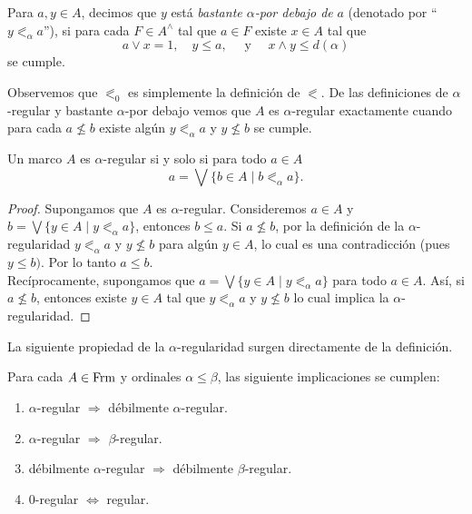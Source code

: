 \begin{dfn}\label{Definicion8.3.2}
    Para $a, y\in A$, decimos que $y$ está \emph{bastante $\alpha$-por debajo de} $a$ (denotado por ``$y\eqslantless_\alpha a$''), si para cada $F\in A^\wedge$ tal que $a\in F$ existe $x\in A$ tal que 
    \[
    a\vee x=1,\quad y\leq a,\quad  \mbox{ y }\quad x\wedge y\leq d(\alpha)
    \]
    se cumple.
\end{dfn}

Observemos que $\eqslantless_0$ es simplemente la definición de $\eqslantless$. De las definiciones de $\alpha$-regular y bastante $\alpha$-por debajo vemos que $A$ es $\alpha$-regular exactamente cuando para cada $a\nleq b$ existe algún $y\eqslantless_\alpha a$ y $y\nleq b$ se cumple.

\begin{lem}\label{Lema8.3.3}
    Un marco $A$ es $\alpha$-regular si y solo si para todo $a\in A$
    \[
    a=\bigvee\{b\in A\mid b\eqslantless_\alpha a\}.
    \]
\end{lem}

\begin{proof}
    Supongamos que $A$ es $\alpha$-regular. Consideremos $a\in A$ y $b=\bigvee\{y\in A\mid y\eqslantless_\alpha a\}$, entonces $b\leq a$. Si $a\nleq b$, por la definición de la $\alpha$-regularidad $y\eqslantless_\alpha a$ y $y\nleq b$ para algún $y\in A$, lo cual es una contradicción (pues $y\leq b)$. Por lo tanto $a\leq b$.\\

    Recíprocamente, supongamos que $a=\bigvee\{y\in A\mid y\eqslantless_\alpha a\}$ para todo $a\in A$. Así, si $a\nleq b$, entonces existe $y\in A$ tal que $y\eqslantless_\alpha a$ y $y\nleq b$ lo cual implica la $\alpha$-regularidad.
\end{proof}

La siguiente propiedad de la $\alpha$-regularidad surgen directamente de la definición.

\begin{lem}\label{Lema8.3.4}
    Para cada $A\in \mathrm{Frm}$ y ordinales $\alpha\leq \beta$, las siguiente implicaciones se cumplen:
    \begin{enumerate}
        \item $\alpha$-regular $\Rightarrow$ débilmente $\alpha$-regular.
        \item $\alpha$-regular $\Rightarrow$ $\beta$-regular.
        \item débilmente $\alpha$-regular $\Rightarrow$ débilmente $\beta$-regular.
        \item $0$-regular $\Leftrightarrow$ regular.
    \end{enumerate}
\end{lem}

